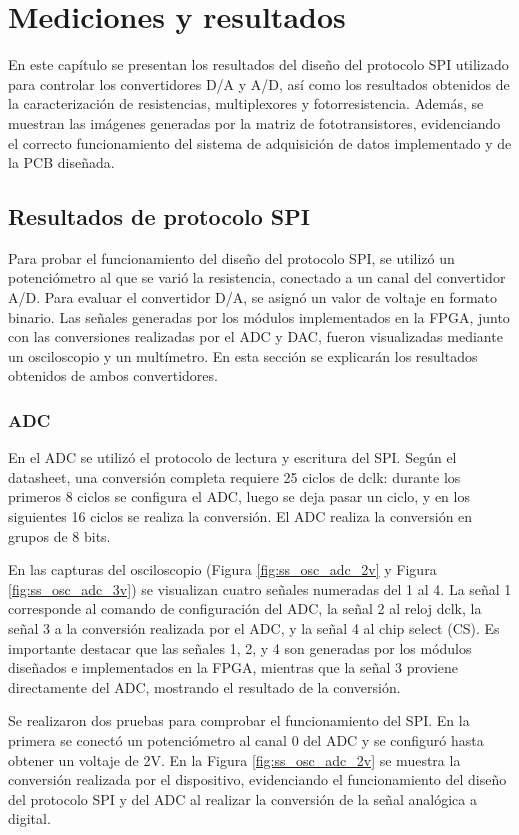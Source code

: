 \chapter{Mediciones y resultados}
En este capítulo se presentan los resultados del diseño del protocolo SPI utilizado para controlar los convertidores D/A y A/D, así como los resultados obtenidos de la caracterización de resistencias, multiplexores y fotorresistencia. Además, se muestran las imágenes generadas por la matriz de fototransistores, evidenciando el correcto funcionamiento del sistema de adquisición de datos implementado y de la PCB diseñada.


\section{Resultados de protocolo SPI}
Para probar el funcionamiento del diseño del protocolo SPI, se utilizó un potenciómetro al que se varió la resistencia, conectado a un canal del convertidor A/D. Para evaluar el convertidor D/A, se asignó un valor de voltaje en formato binario. Las señales generadas por los módulos implementados en la FPGA, junto con las conversiones realizadas por el ADC y DAC, fueron visualizadas mediante un osciloscopio y un multímetro. En esta sección se explicarán los resultados obtenidos de ambos convertidores.

\subsection{ADC}
En el ADC se utilizó el protocolo de lectura y escritura del SPI. Según el datasheet, una conversión completa requiere 25 ciclos de dclk: durante los primeros 8 ciclos se configura el ADC, luego se deja pasar un ciclo, y en los siguientes 16 ciclos se realiza la conversión. El ADC realiza la conversión en grupos de 8 bits.


En las capturas del osciloscopio (Figura \ref{fig:ss_osc_adc_2v} y Figura \ref{fig:ss_osc_adc_3v}) se visualizan cuatro señales numeradas del 1 al 4. La señal 1 corresponde al comando de configuración del ADC, la señal 2 al reloj dclk, la señal 3 a la conversión realizada por el ADC, y la señal 4 al chip select (CS). Es importante destacar que las señales 1, 2, y 4 son generadas por los módulos diseñados e implementados en la FPGA, mientras que la señal 3 proviene directamente del ADC, mostrando el resultado de la conversión.


Se realizaron dos pruebas para comprobar el funcionamiento del SPI. En la primera se conectó un potenciómetro al canal 0 del ADC y se configuró hasta obtener un voltaje de 2V. En la Figura \ref{fig:ss_osc_adc_2v} se muestra la conversión realizada por el dispositivo, evidenciando el funcionamiento del diseño del protocolo SPI y del ADC al realizar la conversión de la señal analógica a digital.

